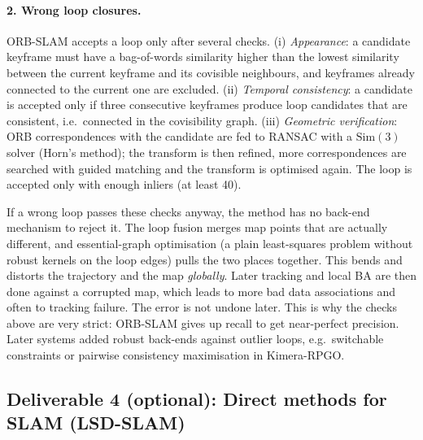 \paragraph{2. Wrong loop closures.}
ORB-SLAM accepts a loop only after several checks.
(i) \emph{Appearance}: a candidate keyframe must have a bag-of-words similarity higher than
the lowest similarity between the current keyframe and its covisible neighbours, and
keyframes already connected to the current one are excluded.
(ii) \emph{Temporal consistency}: a candidate is accepted only if three consecutive
keyframes produce loop candidates that are consistent, i.e.\ connected in the covisibility
graph.
(iii) \emph{Geometric verification}: ORB correspondences with the candidate are fed to
RANSAC with a $\mathrm{Sim}(3)$ solver (Horn's method); the transform is then refined, more
correspondences are searched with guided matching and the transform is optimised again. The
loop is accepted only with enough inliers (at least 40).

If a wrong loop passes these checks anyway, the method has no back-end mechanism to reject
it. The loop fusion merges map points that are actually different, and essential-graph
optimisation (a plain least-squares problem without robust kernels on the loop edges) pulls
the two places together. This bends and distorts the trajectory and the map
\emph{globally}. Later tracking and local BA are then done against a corrupted map, which
leads to more bad data associations and often to tracking failure. The error is not
undone later. This is why the checks above are very strict: ORB-SLAM gives up recall to
get near-perfect precision. Later systems added robust back-ends against outlier loops,
e.g.\ switchable constraints or pairwise consistency maximisation in Kimera-RPGO.

\subsection{Deliverable 4 (optional): Direct methods for SLAM (LSD-SLAM)}\label{sec:d4}

